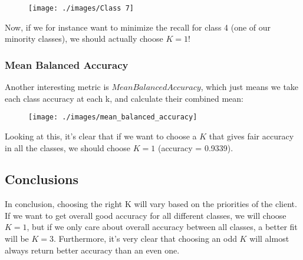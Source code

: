 \documentclass[11pt]{article}
\begin{document}
    \begin{figure}[H]
        \texttt{[image: ./images/Class 7]}
    \end{figure}

    Now, if we for instance want to minimize the recall for class 4 (one of our minority classes), we should actually choose $K=1$!

    \subsubsection*{Mean Balanced Accuracy}
    Another interesting metric is $Mean Balanced Accuracy$, which just means we take each class accuracy at each k, and calculate their combined mean:

    \begin{figure}[H]
        \centering
        \texttt{[image: ./images/mean\_balanced\_accuracy]}
    \end{figure}

    Looking at this, it's clear that if we want to choose a $K$ that gives fair accuracy in all the classes, we should choose $K=1$ (accuracy = 0.9339).

    \subsection*{Conclusions}
    In conclusion, choosing the right K will vary based on the priorities of the client.
    If we want to get overall good accuracy for all different classes, we will choose $K=1$, but if we only care about overall accuracy between all classes, a better fit will be $K=3$.
    Furthermore, it's very clear that choosing an odd $K$ will almost always return better accuracy than an even one.
\end{document}
